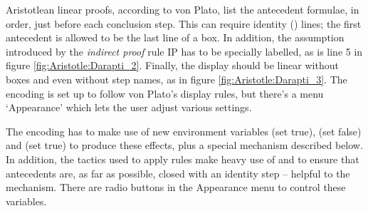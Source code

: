Aristotlean linear proofs, according to von Plato, list the antecedent formulae, in order, just before each conclusion step. This can require identity () lines; the first antecedent is allowed to be the last line of a box. In addition, the assumption introduced by the \emph{indirect proof} rule IP has to be specially labelled, as is line 5 in figure \ref{fig:Aristotle:Darapti_2}. Finally, the display should be linear without boxes and even without step names, as in figure \ref{fig:Aristotle:Darapti_3}. The encoding is set up to follow von Plato's display rules, but there's a menu `Appearance' which lets the user adjust various settings.

The encoding has to make use of new environment variables  (set true),  (set false) and  (set true) to produce these effects, plus a special  mechanism described below. In addition, the tactics used to apply rules make heavy use of  and  to ensure that antecedents are, as far as possible, closed with an identity step -- helpful to the  mechanism. There are radio buttons in the Appearance menu to control these variables.

